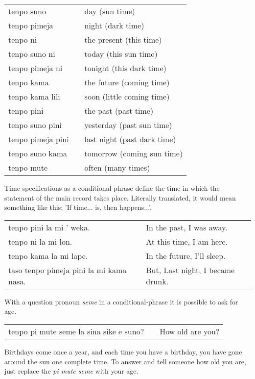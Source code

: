 \begin{supertabular}{p{5,5cm}|ll}
tenpo suno && day (sun time) \\
tenpo pimeja && night (dark time) \\
tenpo ni && the present (this time) \\
tenpo suno ni && today (this sun time) \\
tenpo pimeja ni && tonight (this dark time) \\
tenpo kama && the future (coming time) \\
tenpo kama lili && soon (little coming time) \\
tenpo pini && the past (past time) \\
tenpo suno pini && yesterday (past sun time) \\
tenpo pimeja pini && last night (past dark time) \\
tenpo suno kama && tomorrow (coming sun time) \\
tenpo mute && often (many times) \\
\end{supertabular} 

Time specifications as a conditional phrase define the time in which the statement of the main record takes place. 
Literally translated, it would mean something like this: 'If time... is, then happens...'. 

\begin{supertabular}{p{5,5cm}|ll}
tenpo pini la mi ' weka. && In the past, I was away. \\
tenpo ni la mi lon. && At this time, I am here. \\
tenpo kama la mi lape. && In the future, I'll sleep. \\
taso tenpo pimeja pini la mi kama nasa. && But, Last night, I became drunk. \\
\end{supertabular} 

%
%

With a question pronoun \textit{seme} in a conditional-phrase it is possible to ask for age.

\begin{supertabular}{p{5,5cm}|ll}
tenpo pi mute seme la sina sike e suno? && How old are you? \\
\end{supertabular} 

Birthdays come once a year, and each time you have a birthday, you have gone around the sun one complete time. 
To answer and tell someone how old you are, just replace the \textit{pi mute seme} with your age.

